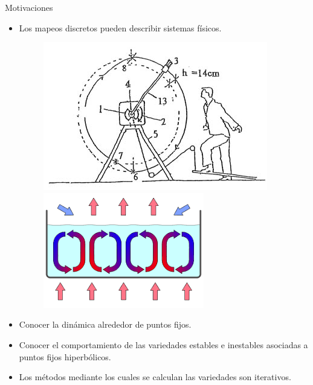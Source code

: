 \documentclass[11pt]{beamer}
\theoremstyle{definition}
\begin{document}
\begin{frame}{Motivaciones}	
\begin{itemize}
\item Los mapeos discretos pueden describir sistemas f\'isicos.\\
\begin{figure}
	\centering
	\includegraphics[scale=1.5]{kicked.jpg}
	\includegraphics[scale=.4]{conveccion.png}
	\label{fig:rotor}
\end{figure}
\item Conocer la din\'amica alrededor de puntos fijos.\\

\item Conocer el comportamiento de las variedades estables e inestables asociadas a puntos fijos hiperb\'olicos.\\

\item Los m\'etodos mediante los cuales se calculan las variedades son iterativos.\\
\end{itemize}

\end{frame}
\end{document}
